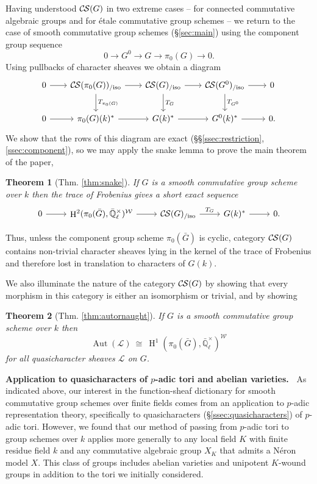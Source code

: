 \documentclass[10pt]{amsart}
\theoremstyle{plain}
\newtheorem*{theorem*}{Theorem}
\theoremstyle{definition}
\theoremstyle{remark}
\newcommand{\EE}{\mathbb{\bar Q}_\ell}
\newcommand{\Fq}{k}
\newcommand{\EEx}{\EE^\times}
\newcommand{\Weil}[1]{\mathcal{W}_{#1}}
\DeclareMathOperator{\Aut}{Aut}
\DeclareMathOperator{\Hh}{H}
\newcommand{\iso}{{\ \cong\ }}
\newcommand{\TrFrob}[1]{T_{#1}}
\newcommand{\cs}[1]{{\mathcal{#1}}}
\newcommand{\CS}{{\mathcal{C\hskip-0.8pt S}}}
\newcommand{\CSiso}[1]{\CS(#1)_{/\text{iso}}}
\newcommand{\bG}{\bar{G}}
\begin{document}
Having understood $\CS(G)$ in two extreme cases --
for connected commutative algebraic groups and for \'etale commutative group schemes -- we return to the case of smooth commutative group schemes (\S\ref{sec:main}) using the component group sequence
\[
0 \to G^0 \to G \to \pi_0(G) \to 0.
\]
Using pullbacks of character sheaves we obtain a diagram
\[
  \begin{tikzcd}[row sep=20, column sep=20]
    0 \rar & \CSiso{\pi_0(G)} \rar \dar{\TrFrob{\pi_0(G)}}
    & \CSiso{G} \rar \dar{\TrFrob{G}} & \CSiso{G^0} \rar \dar{\TrFrob{G^0}} & 0\\
    0 \rar & \pi_0(G)(\Fq)^* \rar & G(\Fq)^* \rar & G^0(\Fq)^* \rar & 0.
  \end{tikzcd}
\]
We show that the rows of this diagram are exact (\S\S\ref{ssec:restriction},\ref{ssec:component}), so we may apply the snake lemma to prove the main theorem of the paper,
\begin{theorem*}[{Thm. \ref{thm:snake}}]
If $G$ is a smooth commutative group scheme over $\Fq$ then the trace of Frobenius gives a short exact sequence
\[
\begin{tikzcd}
0 \arrow{r} & \Hh^2(\pi_0(\bG),\EEx)^{\Weil{}} \arrow{r} & \CSiso{G} \arrow{r}{\TrFrob{G}} & G(\Fq)^* \arrow{r} & 0.
\end{tikzcd}
\]
\end{theorem*}
\noindent
Thus, unless the component group scheme $\pi_0(\bG)$ is cyclic, category $\CS(G)$ contains non-trivial character sheaves lying in the kernel of the trace of Frobenius and therefore lost in translation to characters of $G(\Fq)$.


We also illuminate the nature of the category $\CS(G)$ by showing that every morphism in this category is either an isomorphism or trivial, and by showing
\begin{theorem*}[{Thm. \ref{thm:autornaught}}]
If $G$ is a smooth commutative group scheme over $\Fq$ then
\[
\Aut(\cs{L}) \iso  \Hh^1(\pi_0(\bG), \EEx)^{\Weil{}}
\]
for all quasicharacter sheaves $\cs{L}$ on $G$.
\end{theorem*}

\medskip
\noindent\textbf{Application to quasicharacters of $p$-adic tori and abelian varieties.\ }
As indicated above, our interest in the function-sheaf dictionary for smooth commutative group schemes
over finite fields comes from an application to $p$-adic representation theory,
specifically to quasicharacters (\S\ref{ssec:quasicharacters}) of $p$-adic tori.
However, we found that our method of passing from $p$-adic tori to group schemes over $\Fq$ applies more generally to
any local field $K$ with finite residue field $\Fq$ and any commutative algebraic group $X_K$ that admits a N\'eron model $X$.
This class of groups includes abelian varieties and unipotent $K$-wound groups in addition to the tori we initially considered.
\end{document}
